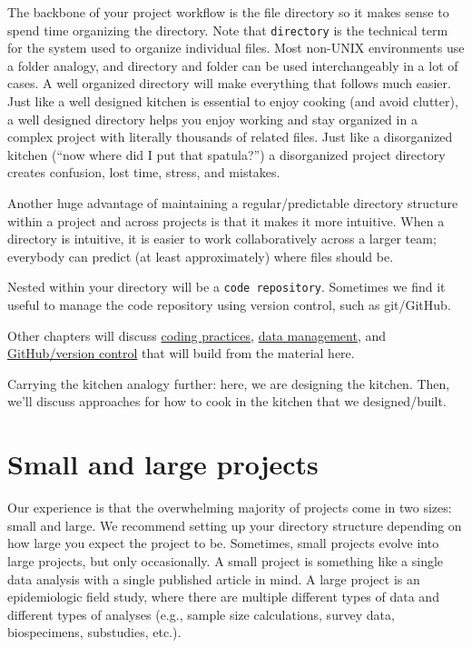 \documentclass[
]{book}
\begin{document}
The backbone of your project workflow is the file directory so it makes sense to spend time organizing the directory. Note that \texttt{directory} is the technical term for the system used to organize individual files. Most non-UNIX environments use a folder analogy, and directory and folder can be used interchangeably in a lot of cases. A well organized directory will make everything that follows much easier. Just like a well designed kitchen is essential to enjoy cooking (and avoid clutter), a well designed directory helps you enjoy working and stay organized in a complex project with literally thousands of related files. Just like a disorganized kitchen (``now where did I put that spatula?'') a disorganized project directory creates confusion, lost time, stress, and mistakes.

Another huge advantage of maintaining a regular/predictable directory structure within a project and across projects is that it makes it more intuitive. When a directory is intuitive, it is easier to work collaboratively across a larger team; everybody can predict (at least approximately) where files should be.

Nested within your directory will be a \texttt{code\ repository}. Sometimes we find it useful to manage the code repository using version control, such as git/GitHub.

Other chapters will discuss \protect\hyperlink{codingpractices}{coding practices}, \protect\hyperlink{datamanagement}{data management}, and \protect\hyperlink{github}{GitHub/version control} that will build from the material here.

Carrying the kitchen analogy further: here, we are designing the kitchen. Then, we'll discuss approaches for how to cook in the kitchen that we designed/built.

\hypertarget{small-and-large-projects}{%
\section{Small and large projects}\label{small-and-large-projects}}

Our experience is that the overwhelming majority of projects come in two sizes: small and large. We recommend setting up your directory structure depending on how large you expect the project to be. Sometimes, small projects evolve into large projects, but only occasionally. A small project is something like a single data analysis with a single published article in mind. A large project is an epidemiologic field study, where there are multiple different types of data and different types of analyses (e.g., sample size calculations, survey data, biospecimens, substudies, etc.).
\end{document}
